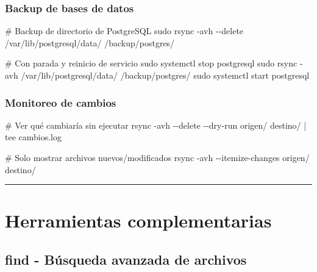 \documentclass[
  11pt,
  letterpaper,
  oneside,
  openany]{scrbook}
\newenvironment{Shaded}{}{}
\newcommand{\AttributeTok}[1]{\textcolor[rgb]{0.84,0.23,0.29}{#1}}
\newcommand{\CommentTok}[1]{\textcolor[rgb]{0.42,0.45,0.49}{#1}}
\newcommand{\FunctionTok}[1]{\textcolor[rgb]{0.44,0.26,0.76}{#1}}
\newcommand{\KeywordTok}[1]{\textcolor[rgb]{0.84,0.23,0.29}{#1}}
\newcommand{\NormalTok}[1]{\textcolor[rgb]{0.14,0.16,0.18}{#1}}
\begin{document}
\subsubsection{Backup de bases de datos}\label{backup-de-bases-de-datos}

\begin{Shaded}
\begin{Highlighting}[]
\CommentTok{\# Backup de directorio de PostgreSQL}
\FunctionTok{sudo}\NormalTok{ rsync }\AttributeTok{{-}avh} \AttributeTok{{-}{-}delete}\NormalTok{ /var/lib/postgresql/data/ /backup/postgres/}

\CommentTok{\# Con parada y reinicio de servicio}
\FunctionTok{sudo}\NormalTok{ systemctl stop postgresql}
\FunctionTok{sudo}\NormalTok{ rsync }\AttributeTok{{-}avh}\NormalTok{ /var/lib/postgresql/data/ /backup/postgres/}
\FunctionTok{sudo}\NormalTok{ systemctl start postgresql}
\end{Highlighting}
\end{Shaded}

\subsubsection{Monitoreo de cambios}\label{monitoreo-de-cambios}

\begin{Shaded}
\begin{Highlighting}[]
\CommentTok{\# Ver qué cambiaría sin ejecutar}
\FunctionTok{rsync} \AttributeTok{{-}avh} \AttributeTok{{-}{-}delete} \AttributeTok{{-}{-}dry{-}run}\NormalTok{ origen/ destino/ }\KeywordTok{|} \FunctionTok{tee}\NormalTok{ cambios.log}

\CommentTok{\# Solo mostrar archivos nuevos/modificados}
\FunctionTok{rsync} \AttributeTok{{-}avh} \AttributeTok{{-}{-}itemize{-}changes}\NormalTok{ origen/ destino/}
\end{Highlighting}
\end{Shaded}

\begin{center}\rule{0.5\linewidth}{0.5pt}\end{center}

\section{Herramientas
complementarias}\label{herramientas-complementarias}

\subsection{find - Búsqueda avanzada de
archivos}\label{find---buxfasqueda-avanzada-de-archivos}
\end{document}
